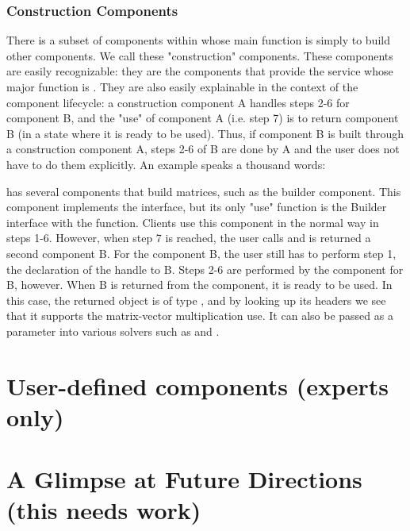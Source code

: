 \subsubsection{Construction Components}

There is a subset of components within \hypre{} whose main function is simply to
build other components. 
We call these "construction" components. These components are easily
recognizable: they are the 
components that provide the  service whose major function is
. They are 
also easily explainable in the context of the component lifecycle:
a construction component A 
handles steps 2-6 for component B, and the "use" of component A (i.e. step 7)
is to return component B (in 
a state where it is ready to be used). Thus, if component B is built through a
construction component A, 
steps 2-6 of B are done by A and the user does not have to do them explicitly.
An example speaks a 
thousand words:

\hypre{} has several components that build matrices, such as the
 builder 
component. This component implements the  interface, but
its only "use" function 
is the Builder interface with the  function. Clients use
this component in the normal 
way in steps 1-6. However, when step 7 is reached, the user calls
 and is returned a 
second component B. For the component B, the user still has to perform step 1,
the declaration of the 
handle to B. Steps 2-6 are performed by the 
component for B, however. 
When B is returned from the component, it is ready to be used. In this case,
the returned object is of type 
, and by looking up its headers we see that it supports the
matrix-vector multiplication 
use. It can also be passed as a parameter into various solvers such as
 and 
.


\section{User-defined components (experts only)}

\section{A Glimpse at Future Directions (this needs work)}

